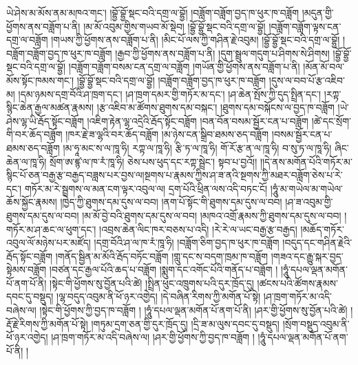 ཡེ་ཤེས་མ་མོས་ནམ་མཁའ་གང་། །བྷྱོ་བྷྱོ་སྡང་བའི་དགྲ་ལ་བྷྱོ། །བཟློག་བཟློག་བྱད་ཁ་ཕུར་ཁ་བཟློག །མདུན་གྱི་ཕྱོགས་ནས་བཟློག་པ་ནི། །མ་མོ་འབུམ་གྱིས་གཡབ་མོ་སྡེབ། །བྷྱོ་བྷྱོ་སྡང་བའི་དགྲ་ལ་བྷྱོ། །བཟློག་བཟློག་ལྟས་ངན་དགྲ་ལ་བཟློག །གཡས་ཀྱི་ཕྱོགས་ནས་བཟློག་པ་ནི། །མིང་པོ་ལས་ཀྱི་གཤིན་རྗེ་འབུམ། །བྷྱོ་བྷྱོ་སྡང་བའི་དགྲ་ལ་བྷྱོ། །བཟློག་བཟློག་བྱད་ཁ་ཕུར་ཁ་བཟློག །རྒྱབ་ཀྱི་ཕྱོགས་ནས་བཟློག་པ་ནི། །དུག་སྦྲུལ་གདུག་པ་ཤིགས་སེ་ཤིགས། །བྷྱོ་བྷྱོ་སྡང་བའི་དགྲ་ལ་བྷྱོ། །བཟློག་བཟློག་བསམ་ངན་དགྲ་ལ་བཟློག །གཡོན་གྱི་ཕྱོགས་ནས་བཟློག་པ་ནི། །མོན་མོ་བལ་མོས་སྟོང་ཁམས་གང་། །བྷྱོ་བྷྱོ་སྡང་བའི་དགྲ་ལ་བྷྱོ། །བཟློག་བཟློག་བྱད་ཁ་ཕུར་ཁ་བཟློག །དུས་ལ་བབ་པོ་རྩ་འཇིབ་མ། །དམ་ཉམས་དགྲ་བོའི་ཤ་ཁྲག་དང་། །ཤ་ཁྲག་དམར་གྱི་གཏོར་མ་དང་། །ཤ་ཆེན་སྤོས་ཀྱི་དུད་སྤྲིན་དང་། །རཀྟ་སྙིང་ཆེན་རྒྱལ་མཚན་རྣམས། །རྩ་འཇིབ་མ་ཚོགས་ཐུགས་དམ་བསྐང་། །ཐུགས་དམ་བསྐོངས་ལ་བྱད་ཁ་བཟློག །ཡེ་ཤེས་ལྷ་ཡི་རྦོད་སྟོང་བཟློག །འཇིག་རྟེན་ལྷ་འདྲེའི་རྦོད་སྟོང་བཟློག །བན་བོན་བསམ་སྦྱོར་ངན་པ་བཟློག །ཚེ་དང་སྲོག་གི་བར་ཆོད་བཟློག །ཁར་རྗེ་ཟ་ལྷའི་བར་ཆོད་བཟློག །མ་ཉེས་ངན་སྒྲིབ་ཐམས་ཅད་བཟློག །བསམ་སྦྱོར་ངན་པ་ཐམས་ཅད་བཟློག །མ་ཧཱ་མང་ས་ལ་ཁཱ་ཧི། རཀྟ་ལ་ཁཱ་ཧི། རྩི་ཏ་ལ་ཁཱ་ཧི། གོ་རོ་རྩ་ན་ལ་ཁཱ་ཧི། བ་སུ་ཏ་ལ་ཁཱ་ཧི། ཞིང་ཆེན་ལ་ཁཱ་ཧི། སྲོག་ཨ་ཛྙ་ལ་ཁ་རཾ་ཁཱ་ཧི། ཅེས་པས་ཕུད་དང་རཀྟ་སྦྲེང་། སྟབ་པ་བྱའོ།། །།དེ་ནས་མགོན་པོའི་གཏོར་མ་སྙིང་པོ་ཅན་བརྒྱ་རྩ་བརྒྱད་བཟླས་པར་བྱས་ལ།སྔགས་པ་རྣམས་ཀྱིས་ཤ་ཟ་ནའི་སྔགས་ཀྱི་མཐར་བཟློག་ཅེས་པ་རེ་དང་། གཏོར་མ་རེ་སྦྲགས་ལ་མན་ངག་ལྟར་འབུལ་ལ། དྲག་པོའི་ཕྲིན་ལས་འདི་བཏང་ངོ། །ཧཱུཾ་མ་གཡེལ་མ་གཡེལ་ཆོས་སྐྱོང་རྣམས། །ཁྱེད་ཀྱི་ཐུགས་དམ་དུས་ལ་བབ། །ནག་པོ་སྟོང་གི་ཐུགས་དམ་དུས་ལ་བབ། །ཤ་ཟ་འབུམ་གྱི་ཐུགས་དམ་དུས་ལ་བབ། །མ་མོ་བྱེ་བའི་ཐུགས་དམ་དུས་ལ་བབ། །མཁའ་འགྲོ་རྣམས་ཀྱི་ཐུགས་དམ་དུས་ལ་བབ། །གཏོར་མ་ཤ་ཆང་ལ་ཕུག་དང་། །འབྲས་ཆེན་ལིང་ཁར་བཅས་པ་འདི། །རེ་རེ་ལ་ཡང་བརྒྱ་རྩ་བརྒྱད། །མཆོད་གཏོར་འབུལ་ལོ་མཉེས་པར་མཛོད། །དགྲ་བོའི་ཤ་ལ་ཁ་རཾ་ཁཱ་ཧི། །བཟློག་ཅིག་བྱད་ཁ་ཕུར་ཁ་བཟློག །བདུད་དང་གཤིན་རྗེའི་རྦོད་སྟོང་བཟློག །གནོད་སྦྱིན་མ་མོའི་རྦོད་བཏོང་བཟློག །གླུ་དང་ས་བདག་ཁྲམ་ཁ་བཟློག །གཟའ་དང་རྒྱུ་སྐར་བྱད་སྟེམས་བཟློག །བཙན་དང་རྒྱལ་པོའི་ཆད་པ་བཟློག །སྨུག་དང་འགོང་པོའི་གནོད་པ་བཟློག ། །ཧཱུཾ་དཔལ་ལྡན་མགོན་པོ་ནག་པོ་ནི། །སྟེང་གི་ཕྱོགས་སུ་བྱོན་པའི་ཚེ། །སྤྲིན་ཕུང་འཁྲུགས་པའི་དུར་ཁྲོད་དུ། །ཚངས་པའི་ཚོགས་རྣམས་དབང་དུ་བསྡུད། །ལྷ་བདུད་འབུམ་ནི་ཕོ་ཉར་འགྱེད། །དེ་བཞིན་རིགས་ཀྱི་མགོན་པོ་སྟེ། །ཤ་ཁྲག་གཏོར་མ་འདི་བཞེས་ལ། །སྟེང་གི་ཕྱོགས་ཀྱི་བྱད་ཁ་བཟློག ། །ཧཱུཾ་དཔལ་ལྡན་མགོན་པོ་ནག་པོ་ནི། །ཤར་གྱི་ཕྱོགས་སུ་བྱོན་པའི་ཚེ། །རྡོ་རྗེ་རིགས་ཀྱི་མགོན་པོ་སྟེ། །གཏུམ་དྲག་ཅན་གྱི་དུར་ཁྲོད་དུ། །དྲི་ཟ་མ་ལུས་དབང་དུ་བསྡུད། །སྲོག་བསྡུད་འབུམ་ནི་ཕོ་ཉར་འགྱེད། །ཤ་ཁྲག་གཏོར་མ་འདི་བཞེས་ལ། །ཤར་གྱི་ཕྱོགས་ཀྱི་བྱད་ཁ་བཟློག ། །ཧཱུཾ་དཔལ་ལྡན་མགོན་པོ་ནག་པོ་ནི། །
